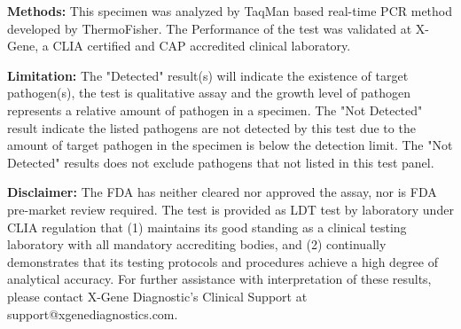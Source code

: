 \documentclass[10pt, letterpaper]{article}
\begin{document}
\noindent
\fontsize{8}{11}\selectfont 
\textbf{Methods:} 
{\small This specimen was analyzed by TaqMan based real-time PCR method developed by ThermoFisher.  The Performance of the test was validated at X-Gene, a CLIA certified and CAP accredited clinical laboratory.} 

\vspace{10pt}

\noindent
\textbf{Limitation:} 
{\small The "Detected" result(s) will indicate the existence of target pathogen(s), the test is qualitative assay and the growth level of pathogen represents a relative amount of pathogen in a specimen. The "Not Detected" result indicate the listed pathogens are not detected by this test due to the amount of target pathogen in the specimen is below the detection limit.  The "Not Detected" results does not exclude pathogens that not listed in this test panel.}

\vspace{10pt}

\noindent
\textbf{Disclaimer:} 
{\small The FDA has neither cleared nor approved the assay, nor is FDA pre-market review required. The test is provided as LDT test by laboratory under CLIA regulation that (1) maintains its good standing as a clinical testing laboratory with all mandatory accrediting bodies, and (2) continually demonstrates that its testing protocols and procedures achieve a high degree of analytical accuracy. For further assistance with interpretation of these results, please contact X-Gene Diagnostic's Clinical Support at support@xgenediagnostics.com.}

\newpage

\end{document}
